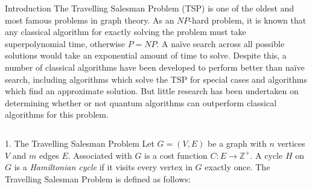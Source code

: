 \documentclass[]{templates/poster}
\begin{document}

\begin{frame}{} 

\begin{columns}[t]
  \begin{column}{0.900\linewidth}
  \begin{block}{\Large Introduction}
  The Travelling Salesman Problem (TSP) is one of the oldest and most famous problems in graph theory. As an $NP$-hard problem, it is known that any classical algorithm for exactly solving the problem must take superpolynomial time, otherwise $P = NP$. A na\"ive search across all possible solutions would take an exponential amount of time to solve. Despite this, a number of classical algorithms have been developed to perform better than na\"ive search, including algorithms which solve the TSP for special cases and algorithms which find an approximate solution. But little research has been undertaken on determining whether or not quantum algorithms can outperform classical algorithms for this problem.
  \end{block}
  \end{column}
\end{columns}

\begin{columns}[t]
  \begin{column}{0.422\linewidth}
  \begin{block}{\Large 1. The Travelling Salesman Problem}
  Let $G = (V, E)$ be a graph with $n$ vertices $V$ and $m$ edges $E$. Associated with $G$ is a cost function $C \colon E \rightarrow \mathbb{Z}^+$. A cycle $H$ on $G$ is a {\em Hamiltonian cycle} if it visits every vertex in $G$ exactly once. The Travelling Salesman Problem is defined as follows:
  

\end{block}
\end{column}
\end{columns}
\end{frame}
\end{document}

